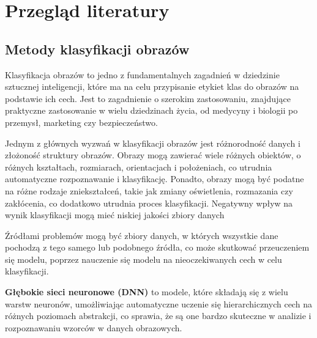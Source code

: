 
\chapter*{Przegląd literatury}
\section*{Metody klasyfikacji obrazów}

Klasyfikacja obrazów to jedno z fundamentalnych zagadnień w dziedzinie sztucznej inteligencji, które ma na celu przypisanie etykiet klas do obrazów na podstawie ich cech.
Jest to zagadnienie o szerokim zastosowaniu, znajdujące praktyczne zastosowanie w wielu dziedzinach życia, od medycyny\cite{medical} i biologii\cite{biology} po przemysł, marketing\cite{marketing} czy bezpieczeństwo\cite{security}.

Jednym z głównych wyzwań w klasyfikacji obrazów\cite{imageclassficationchallanges} jest różnorodność danych i złożoność struktury obrazów.
Obrazy mogą zawierać wiele różnych obiektów, o różnych kształtach, rozmiarach, orientacjach i położeniach, co utrudnia automatyczne rozpoznawanie i klasyfikację.
Ponadto, obrazy mogą być podatne na różne rodzaje zniekształceń, takie jak zmiany oświetlenia, rozmazania czy zakłócenia, co dodatkowo utrudnia proces klasyfikacji.
Negatywny wpływ na wynik klasyfikacji mogą mieć niskiej jakości zbiory danych

Źródłami  problemów mogą być zbiory danych, w których wszystkie dane pochodzą z tego samego lub podobnego źródła, co może skutkować przeuczeniem się modelu, poprzez nauczenie się modelu na nieoczekiwanych cech w celu klasyfikacji.

\textbf{Głębokie sieci neuronowe (DNN)}\cite{nature} to modele, które składają się z wielu warstw neuronów, umożliwiając automatyczne uczenie się hierarchicznych cech na różnych poziomach abstrakcji, co sprawia, że są one bardzo skuteczne w analizie i rozpoznawaniu wzorców w danych obrazowych.

